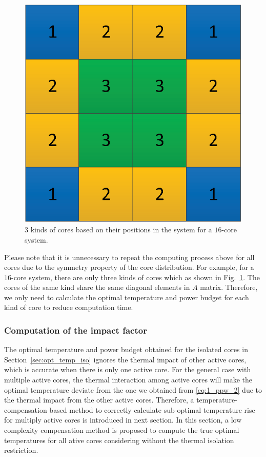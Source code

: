 \begin{figure}
\centering
\includegraphics[width=0.46\linewidth]{fig/unique_position.eps}
\caption{$3$ kinds of cores based on their positions in the system for a $16$-core system.}
\label{fig:unique_position}
\end{figure}

Please note that it is unnecessary to repeat the computing process
above for all cores due to the symmetry property of the core
distribution. For example, for a $16$-core system, there are only
three kinds of cores which as shown in
Fig.~\ref{fig:unique_position}. The cores of the same kind share the
same diagonal elements in $A$ matrix. Therefore, we only need to
calculate the optimal temperature and power budget for each kind of
core to reduce computation time.


\subsubsection{Computation of the impact factor}

The optimal temperature and power budget obtained for the
isolated cores in Section~\ref{sec:opt_temp_iso} ignores the thermal impact of other active cores, which
is accurate when there is only one active core. For the general
case with multiple active cores, the thermal interaction among active
cores will make the optimal temperature deviate from the one we
obtained from \eqref{eq:1_ppw_2} due to the thermal impact from the
other active cores. Therefore, a temperature-compensation based method to correctly calculate sub-optimal temperature rise for multiply active cores is introduced in next section.
In this section, a low complexity compensation method is proposed to compute the true
optimal temperatures for all ative cores considering without the
thermal isolation restriction.

